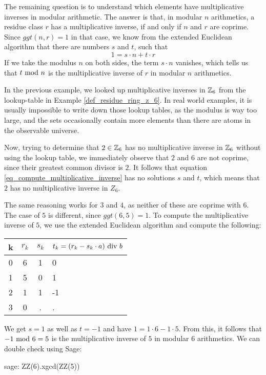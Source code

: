 The remaining question is to understand which elements have multiplicative inverses in modular arithmetic. The answer is that, in modular $n$ arithmetics, a residue class $r$ has a multiplicative inverse, if and only if $n$ and $r$ are coprime. Since $ggt(n,r)=1$ in that case, we know from the extended Euclidean algorithm that there are numbers $s$ and $t$, such that 
\begin{equation}
\label{eq_compute_multiplicative_inverse}
1 = s\cdot n + t\cdot r
\end{equation}
If we take the modulus $n$ on both sides, the term $s\cdot n$ vanishes, which tells us that $t \text{ mod } n$ is the multiplicative inverse of $r$ in modular $n$ arithmetics.
\begin{example} In the previous example, we looked up multiplicative inverses in $\mathbb{Z}_6$ from the lookup-table in Example \ref{def_residue_ring_z_6}. In real world examples, it is  usually impossible to write down those lookup tables, as the modulus is way too large, and the sets occasionally contain more elements than there are atoms in the observable universe.

Now, trying to determine that $2\in \mathbb{Z}_6$ has no multiplicative inverse in $\mathbb{Z}_6$ without using the lookup table, we immediately observe that $2$ and $6$ are not coprime, since their greatest common divisor is $2$. It follows that equation \ref{eq_compute_multiplicative_inverse} has no solutions $s$ and $t$, which means that $2$ has no multiplicative inverse in $Z_6$.

The same reasoning works for $3$ and $4$, as neither of these are coprime with $6$. The case of  $5$ is different, since $ggt(6,5)=1$. To compute the multiplicative inverse of $5$, we use the extended Euclidean algorithm and compute  the following:
\begin{center}
  \begin{tabular}{c | c c l}
    k & $ r_k $ & $ s_k $ & $ t_k = (r_k-s_k \cdot a) \text{ div } b $ \\\hline
    0 & 6 & 1 & 0 \\
    1 & 5 & 0 & 1 \\
    2 & 1 & 1 & -1 \\
    3 & 0 & . & . \\
  \end{tabular}
\end{center}

We get $s=1$ as well as $t=-1$ and have $1 = 1\cdot 6 -1\cdot 5$. From this, it follows that $-1 \text{ mod } 6=5$ is the multiplicative inverse of $5$ in modular $6$ arithmetics. We can double check using Sage:
\begin{sagecommandline}
sage: ZZ(6).xgcd(ZZ(5))
\end{sagecommandline}
\end{example}

